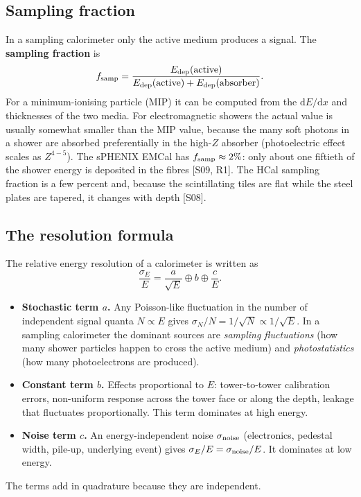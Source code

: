 \documentclass[11pt,letterpaper]{article}
\begin{document}
\subsection{Sampling fraction}
In a sampling calorimeter only the active medium produces a signal.
The \textbf{sampling fraction} is
\begin{equation}
f_{\rm samp}=\frac{E_{\rm dep}(\text{active})}{E_{\rm dep}(\text{active})+E_{\rm dep}(\text{absorber})}.
\end{equation}
For a minimum-ionising particle (MIP) it can be computed from the $\mathrm{d}E/\mathrm{d}x$ and thicknesses of the two media.
For electromagnetic showers the actual value is usually somewhat smaller than the MIP value, because the many soft photons in a shower are absorbed preferentially in the high-$Z$ absorber (photoelectric effect scales as $Z^{4-5}$).
The sPHENIX EMCal has $f_{\rm samp}\approx2\%$: only about one fiftieth of the shower energy is deposited in the fibres [S09, R1].
The HCal sampling fraction is a few percent and, because the scintillating tiles are flat while the steel plates are tapered, it changes with depth [S08].

\subsection{The resolution formula}
The relative energy resolution of a calorimeter is written as
\begin{equation}
\frac{\sigma_E}{E}=\frac{a}{\sqrt{E}}\oplus b\oplus\frac{c}{E}.\label{eq:res}
\end{equation}
\begin{itemize}
\item \textbf{Stochastic term $a$.} Any Poisson-like fluctuation in the number of independent signal quanta $N\propto E$ gives $\sigma_N/N=1/\sqrt{N}\propto1/\sqrt{E}$. In a sampling calorimeter the dominant sources are \emph{sampling fluctuations} (how many shower particles happen to cross the active medium) and \emph{photostatistics} (how many photoelectrons are produced).
\item \textbf{Constant term $b$.} Effects proportional to $E$: tower-to-tower calibration errors, non-uniform response across the tower face or along the depth, leakage that fluctuates proportionally. This term dominates at high energy.
\item \textbf{Noise term $c$.} An energy-independent noise $\sigma_{\rm noise}$ (electronics, pedestal width, pile-up, underlying event) gives $\sigma_E/E=\sigma_{\rm noise}/E$. It dominates at low energy.
\end{itemize}
The terms add in quadrature because they are independent.
\end{document}
